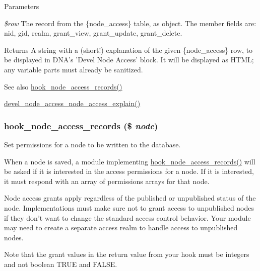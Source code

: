 \begin{DoxyParams}{Parameters}
\item[{\em \$row}]The record from the \{node\_\-access\} table, as object. The member fields are: nid, gid, realm, grant\_\-view, grant\_\-update, grant\_\-delete.\end{DoxyParams}
\begin{DoxyReturn}{Returns}
A string with a (short!) explanation of the given \{node\_\-access\} row, to be displayed in DNA's 'Devel Node Access' block. It will be displayed as HTML; any variable parts must already be sanitized.
\end{DoxyReturn}
\begin{DoxySeeAlso}{See also}
\hyperlink{group__node__access_ga3fe7744d74446e40e9b9ad2a782b4269}{hook\_\-node\_\-access\_\-records()} 

\hyperlink{devel__node__access_8module_a7b594d5b01b220abc354695853569809}{devel\_\-node\_\-access\_\-node\_\-access\_\-explain()} 
\end{DoxySeeAlso}
\hypertarget{group__node__access_ga3fe7744d74446e40e9b9ad2a782b4269}{
\subsubsection[{hook\_\-node\_\-access\_\-records}]{\setlength{\rightskip}{0pt plus 5cm}hook\_\-node\_\-access\_\-records (\$ {\em node})}}
\label{group__node__access_ga3fe7744d74446e40e9b9ad2a782b4269}
Set permissions for a node to be written to the database.

When a node is saved, a module implementing \hyperlink{group__node__access_ga3fe7744d74446e40e9b9ad2a782b4269}{hook\_\-node\_\-access\_\-records()} will be asked if it is interested in the access permissions for a node. If it is interested, it must respond with an array of permissions arrays for that node.

Node access grants apply regardless of the published or unpublished status of the node. Implementations must make sure not to grant access to unpublished nodes if they don't want to change the standard access control behavior. Your module may need to create a separate access realm to handle access to unpublished nodes.

Note that the grant values in the return value from your hook must be integers and not boolean TRUE and FALSE.

